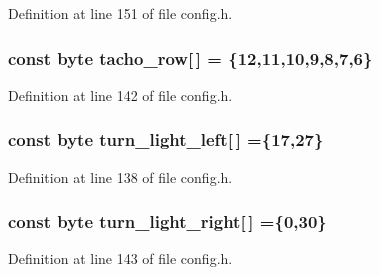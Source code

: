 Definition at line 151 of file config.\+h.

\subsubsection[{\texorpdfstring{tacho\+\_\+row}{tacho_row}}]{\setlength{\rightskip}{0pt plus 5cm}const byte tacho\+\_\+row\mbox{[}$\,$\mbox{]} = \{12,11,10,9,8,7,6\}}\hypertarget{group__deployment_ga6ade605406f4c1ce9f03a5a2530f6dbe}{}\label{group__deployment_ga6ade605406f4c1ce9f03a5a2530f6dbe}


Definition at line 142 of file config.\+h.

\subsubsection[{\texorpdfstring{turn\+\_\+light\+\_\+left}{turn_light_left}}]{\setlength{\rightskip}{0pt plus 5cm}const byte turn\+\_\+light\+\_\+left\mbox{[}$\,$\mbox{]} =\{17,27\}}\hypertarget{group__deployment_gac03fd0ab9cbcc53730039ad03e9b094d}{}\label{group__deployment_gac03fd0ab9cbcc53730039ad03e9b094d}


Definition at line 138 of file config.\+h.

\subsubsection[{\texorpdfstring{turn\+\_\+light\+\_\+right}{turn_light_right}}]{\setlength{\rightskip}{0pt plus 5cm}const byte turn\+\_\+light\+\_\+right\mbox{[}$\,$\mbox{]} =\{0,30\}}\hypertarget{group__deployment_gaa5a6ee27fdf1d7c939cdf2a7266d7e84}{}\label{group__deployment_gaa5a6ee27fdf1d7c939cdf2a7266d7e84}


Definition at line 143 of file config.\+h.

